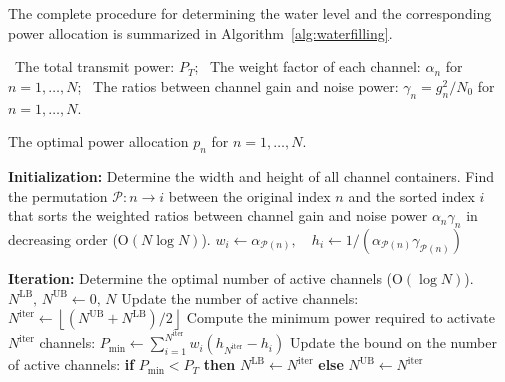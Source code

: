 The complete procedure for determining the water level and the corresponding power allocation is summarized in Algorithm~\ref{alg:waterfilling}.
\begin{algorithm}[!htbp]
\caption{Waterfilling Algorithm for power allocation across Gaussian \ac{SISO} subchannels}
\label{alg:waterfilling}
\begin{algorithmic}[1]
    
    \Require 
    \Statex \hspace{-\algorithmicindent} \textbullet \, The total transmit power: $P_T$;
    \Statex \hspace{-\algorithmicindent} \textbullet \, The weight factor of each channel: $\alpha_n$ for $n = 1, \dots, N$;
    \Statex \hspace{-\algorithmicindent} \textbullet \, The ratios between channel gain and noise power: $\gamma_n = g^2_n / N_0$ for $n = 1, \dots, N$.
    
    \Ensure  The optimal power allocation $p_n$ for $n = 1, \dots, N$.

    \medskip
    \Statex \hspace{-\algorithmicindent}\textbf{Initialization:} Determine the width and height of all channel containers.
    \Statex \hspace{-\algorithmicindent} Find the permutation $\mathcal{P}: n \rightarrow i$ between the original index $n$ and the sorted index $i$ that sorts
    \Statex \hspace{-\algorithmicindent} the weighted ratios between channel gain and noise power $\alpha_n \gamma_n$ in decreasing order ($\mathrm{O}(N\log N)$).
    \State $w_i \leftarrow \alpha_{\mathcal{P}(n)}, \quad h_i \leftarrow 1 / (\alpha_{\mathcal{P}(n)} \gamma_{\mathcal{P}(n)})$
    
    \medskip
    \Statex \hspace{-\algorithmicindent}\textbf{Iteration:} Determine the optimal number of active channels ($\mathrm{O}(\log N)$).
    \State $N^{\mathrm{LB}}, \, N^{\mathrm{UB}} \leftarrow 0, \, N$
        \Statex \hspace{\algorithmicindent/2} Update the number of active channels: 
        \State  $N^{\mathrm{iter}} \leftarrow \left\lfloor (N^{\mathrm{UB}} + N^{\mathrm{LB}}) / 2 \right\rfloor$
        \Statex \hspace{\algorithmicindent/2} Compute the minimum power required to activate $N^{\mathrm{iter}}$ channels:
        \State  $P_{\mathrm{min}} \leftarrow \textstyle\sum_{i=1}^{N^{\mathrm{iter}}} w_i \left( h_{N^{\mathrm{iter}}} - h_i \right)$
        \Statex \hspace{\algorithmicindent/2} Update the bound on the number of active channels:
        \State  \textbf{if} $P_{\mathrm{min}} < P_T$ \textbf{then} $N^{\mathrm{LB}} \leftarrow N^{\mathrm{iter}}$ \textbf{else} $N^{\mathrm{UB}} \leftarrow N^{\mathrm{iter}}$
    \EndWhile
    

\end{algorithmic}
\end{algorithm}
